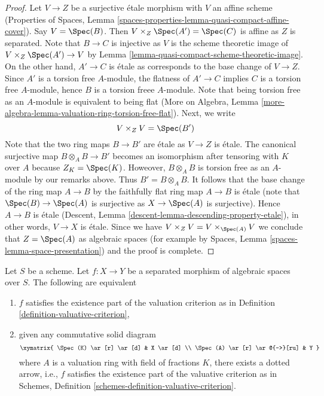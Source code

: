 \begin{proof}
\medskip\noindent
Let $V \to Z$ be a surjective \'etale morphism with $V$ an
affine scheme (Properties of Spaces, Lemma
\ref{spaces-properties-lemma-quasi-compact-affine-cover}).
Say $V = \Spec(B)$. Then $V \times_Z \Spec(A') = \Spec(C)$
is affine as $Z$ is separated. Note that $B \to C$ is injective
as $V$ is the scheme theoretic image of $V \times_Z \Spec(A') \to V$
by Lemma \ref{lemma-quasi-compact-scheme-theoretic-image}.
On the other hand, $A' \to C$ is \'etale as corresponds
to the base change of $V \to Z$.
Since $A'$ is a torsion free $A$-module,
the flatness of $A' \to C$ implies $C$ is a torsion free
$A$-module, hence $B$ is a torsion freee $A$-module.
Note that being torsion free as an $A$-module is
equivalent to being flat (More on Algebra, Lemma
\ref{more-algebra-lemma-valuation-ring-torsion-free-flat}).
Next, we write
$$
V \times_Z V = \Spec(B')
$$
Note that the two ring maps $B \to B'$ are \'etale as $V \to Z$
is \'etale. The canonical surjective map $B \otimes_A B \to B'$
becomes an isomorphism after tensoring with $K$ over $A$
because $Z_K = \Spec(K)$. Howeover, $B \otimes_A B$ is torsion
free as an $A$-module by our remarks above. Thus $B' = B \otimes_A B$.
It follows that the base change of the ring map
$A \to B$ by the faithfully flat ring map $A \to B$
is \'etale (note that $\Spec(B) \to \Spec(A)$ is surjective
as $X \to \Spec(A)$ is surjective). Hence $A \to B$ is
\'etale (Descent, Lemma \ref{descent-lemma-descending-property-etale}),
in other words, $V \to X$ is \'etale.
Since we have $V \times_Z V = V \times_{\Spec(A)} V$
we conclude that $Z = \Spec(A)$ as algebraic spaces
(for example by Spaces, Lemma \ref{spaces-lemma-space-presentation})
and the proof is complete.
\end{proof}

\begin{lemma}
\label{lemma-usual-enough}
Let $S$ be a scheme. Let $f : X \to Y$ be a separated morphism of
algebraic spaces over $S$. The following are equivalent
\begin{enumerate}
\item $f$ satisfies the existence part of the valuation criterion
as in Definition \ref{definition-valuative-criterion},
\item given any commutative solid diagram
$$
\xymatrix{
\Spec(K) \ar[r] \ar[d] & X \ar[d] \\
\Spec(A) \ar[r] \ar@{-->}[ru] & Y
}
$$
where $A$ is a valuation ring with field of fractions $K$, there exists
a dotted arrow, i.e., $f$ satisfies the existence part of the valuative
criterion as in
Schemes, Definition \ref{schemes-definition-valuative-criterion}.
\end{enumerate}
\end{lemma}

